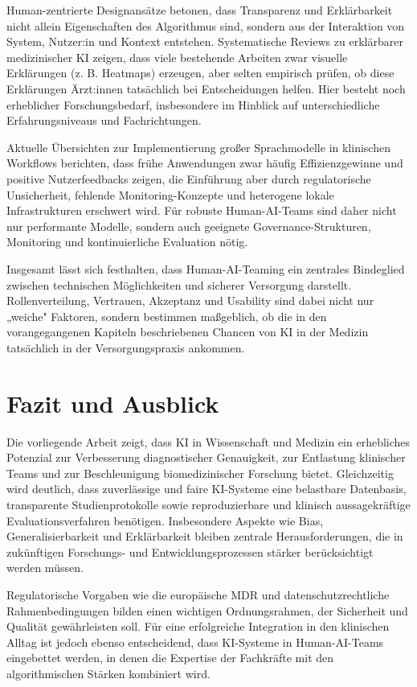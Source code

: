 \documentclass[lettersize,journal]{IEEEtran}
\begin{document}
	Human-zentrierte Designansätze betonen, dass Transparenz und Erklärbarkeit nicht allein Eigenschaften des Algorithmus sind, sondern aus der Interaktion von System, Nutzer:in und Kontext entstehen\cite{ref:chen2022}. Systematische Reviews zu erklärbarer medizinischer KI zeigen, dass viele bestehende Arbeiten zwar visuelle Erklärungen (z. B. Heatmaps) erzeugen, aber selten empirisch prüfen, ob diese Erklärungen Ärzt:innen tatsächlich bei Entscheidungen helfen\cite{ref:chen2022}. Hier besteht noch erheblicher Forschungsbedarf, insbesondere im Hinblick auf unterschiedliche Erfahrungsniveaus und Fachrichtungen.
	
	Aktuelle Übersichten zur Implementierung großer Sprachmodelle in klinischen Workflows berichten, dass frühe Anwendungen zwar häufig Effizienzgewinne und positive Nutzerfeedbacks zeigen, die Einführung aber durch regulatorische Unsicherheit, fehlende Monitoring-Konzepte und heterogene lokale Infrastrukturen erschwert wird\cite{ref:Artsi.2025}. Für robuste Human-AI-Teams sind daher nicht nur performante Modelle, sondern auch geeignete Governance-Strukturen, Monitoring und kontinuierliche Evaluation nötig.
	
	Insgesamt lässt sich festhalten, dass Human-AI-Teaming ein zentrales Bindeglied zwischen technischen Möglichkeiten und sicherer Versorgung darstellt. Rollenverteilung, Vertrauen, Akzeptanz und Usability sind dabei nicht nur „weiche" Faktoren, sondern bestimmen maßgeblich, ob die in den vorangegangenen Kapiteln beschriebenen Chancen von KI in der Medizin tatsächlich in der Versorgungspraxis ankommen.
	
	
\section{Fazit und Ausblick}
Die vorliegende Arbeit zeigt, dass KI in Wissenschaft und Medizin ein erhebliches Potenzial zur Verbesserung diagnostischer Genauigkeit, zur Entlastung klinischer Teams und zur Beschleunigung biomedizinischer Forschung bietet. Gleichzeitig wird deutlich, dass zuverlässige und faire KI-Systeme eine belastbare Datenbasis, transparente Studienprotokolle sowie reproduzierbare und klinisch aussagekräftige Evaluationsverfahren benötigen. Insbesondere Aspekte wie Bias, Generalisierbarkeit und Erklärbarkeit bleiben zentrale Herausforderungen, die in zukünftigen Forschungs- und Entwicklungsprozessen stärker berücksichtigt werden müssen.

Regulatorische Vorgaben wie die europäische MDR und datenschutzrechtliche Rahmenbedingungen bilden einen wichtigen Ordnungsrahmen, der Sicherheit und Qualität gewährleisten soll. Für eine erfolgreiche Integration in den klinischen Alltag ist jedoch ebenso entscheidend, dass KI-Systeme in Human-AI-Teams eingebettet werden, in denen die Expertise der Fachkräfte mit den algorithmischen Stärken kombiniert wird.
\end{document}
